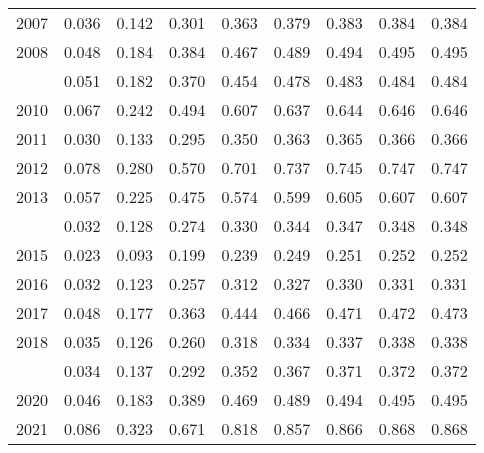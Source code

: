 \documentclass[
]{article}
\begin{document}
\begin{longtable}[t]{lrrrrrrrr}
2007 & 0.036 & 0.142 & 0.301 & 0.363 & 0.379 & 0.383 & 0.384 & 0.384\\
2008 & 0.048 & 0.184 & 0.384 & 0.467 & 0.489 & 0.494 & 0.495 & 0.495\\
\addlinespace
2009 & 0.051 & 0.182 & 0.370 & 0.454 & 0.478 & 0.483 & 0.484 & 0.484\\
2010 & 0.067 & 0.242 & 0.494 & 0.607 & 0.637 & 0.644 & 0.646 & 0.646\\
2011 & 0.030 & 0.133 & 0.295 & 0.350 & 0.363 & 0.365 & 0.366 & 0.366\\
2012 & 0.078 & 0.280 & 0.570 & 0.701 & 0.737 & 0.745 & 0.747 & 0.747\\
2013 & 0.057 & 0.225 & 0.475 & 0.574 & 0.599 & 0.605 & 0.607 & 0.607\\
\addlinespace
2014 & 0.032 & 0.128 & 0.274 & 0.330 & 0.344 & 0.347 & 0.348 & 0.348\\
2015 & 0.023 & 0.093 & 0.199 & 0.239 & 0.249 & 0.251 & 0.252 & 0.252\\
2016 & 0.032 & 0.123 & 0.257 & 0.312 & 0.327 & 0.330 & 0.331 & 0.331\\
2017 & 0.048 & 0.177 & 0.363 & 0.444 & 0.466 & 0.471 & 0.472 & 0.473\\
2018 & 0.035 & 0.126 & 0.260 & 0.318 & 0.334 & 0.337 & 0.338 & 0.338\\
\addlinespace
2019 & 0.034 & 0.137 & 0.292 & 0.352 & 0.367 & 0.371 & 0.372 & 0.372\\
2020 & 0.046 & 0.183 & 0.389 & 0.469 & 0.489 & 0.494 & 0.495 & 0.495\\
2021 & 0.086 & 0.323 & 0.671 & 0.818 & 0.857 & 0.866 & 0.868 & 0.868\\*
\end{longtable}
\end{document}
